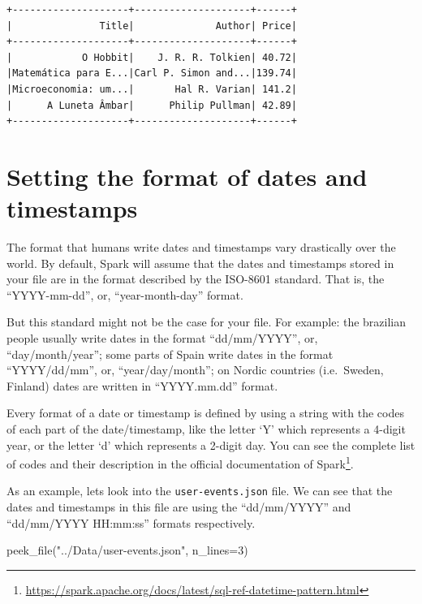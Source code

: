 \documentclass[
  11pt,
  letterpaper,
  DIV=11,
  numbers=noendperiod]{scrreprt}
\newenvironment{Shaded}{\begin{snugshade}}{\end{snugshade}}
\newcommand{\DecValTok}[1]{\textcolor[rgb]{0.68,0.00,0.00}{#1}}
\newcommand{\NormalTok}[1]{\textcolor[rgb]{0.00,0.23,0.31}{#1}}
\newcommand{\OperatorTok}[1]{\textcolor[rgb]{0.37,0.37,0.37}{#1}}
\newcommand{\StringTok}[1]{\textcolor[rgb]{0.13,0.47,0.30}{#1}}
\begin{document}
\begin{verbatim}
+--------------------+--------------------+------+
|               Title|              Author| Price|
+--------------------+--------------------+------+
|            O Hobbit|    J. R. R. Tolkien| 40.72|
|Matemática para E...|Carl P. Simon and...|139.74|
|Microeconomia: um...|       Hal R. Varian| 141.2|
|      A Luneta Âmbar|      Philip Pullman| 42.89|
+--------------------+--------------------+------+
\end{verbatim}

\section{Setting the format of dates and
timestamps}\label{setting-the-format-of-dates-and-timestamps}

The format that humans write dates and timestamps vary drastically over
the world. By default, Spark will assume that the dates and timestamps
stored in your file are in the format described by the ISO-8601
standard. That is, the ``YYYY-mm-dd'', or, ``year-month-day'' format.

But this standard might not be the case for your file. For example: the
brazilian people usually write dates in the format ``dd/mm/YYYY'', or,
``day/month/year''; some parts of Spain write dates in the format
``YYYY/dd/mm'', or, ``year/day/month''; on Nordic countries
(i.e.~Sweden, Finland) dates are written in ``YYYY.mm.dd'' format.

Every format of a date or timestamp is defined by using a string with
the codes of each part of the date/timestamp, like the letter `Y' which
represents a 4-digit year, or the letter `d' which represents a 2-digit
day. You can see the complete list of codes and their description in the
official documentation of Spark\footnote{\url{https://spark.apache.org/docs/latest/sql-ref-datetime-pattern.html}}.

As an example, lets look into the \texttt{user-events.json} file. We can
see that the dates and timestamps in this file are using the
``dd/mm/YYYY'' and ``dd/mm/YYYY HH:mm:ss'' formats respectively.

\begin{Shaded}
\begin{Highlighting}[]
\NormalTok{peek\_file(}\StringTok{"../Data/user{-}events.json"}\NormalTok{, n\_lines}\OperatorTok{=}\DecValTok{3}\NormalTok{)}
\end{Highlighting}
\end{Shaded}
\end{document}
